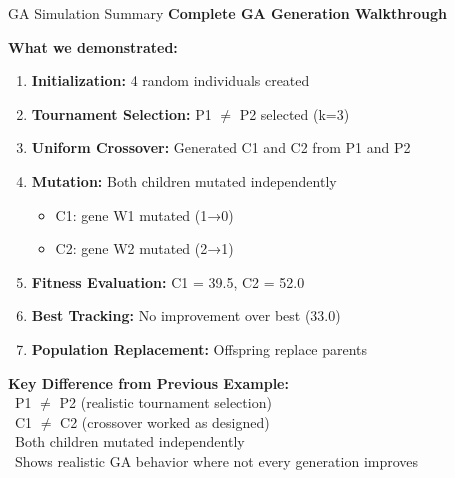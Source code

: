 \documentclass[aspectratio=169,10pt]{beamer}
\begin{document}
\begin{frame}{GA Simulation Summary}
  \colorbox{navymid}{\color{white}\bfseries\large Complete GA Generation Walkthrough}
  
  \vspace{0.3cm}
  \textbf{What we demonstrated:}
  
  \begin{enumerate}
    \item \textbf{Initialization:} 4 random individuals created
    \item \textbf{Tournament Selection:} P1 $\neq$ P2 selected (k=3)
    \item \textbf{Uniform Crossover:} Generated C1 and C2 from P1 and P2
    \item \textbf{Mutation:} Both children mutated independently
      \begin{itemize}
        \item C1: gene W1 mutated (1→0)
        \item C2: gene W2 mutated (2→1)
      \end{itemize}
    \item \textbf{Fitness Evaluation:} C1 = 39.5, C2 = 52.0
    \item \textbf{Best Tracking:} No improvement over best (33.0)
    \item \textbf{Population Replacement:} Offspring replace parents
  \end{enumerate}
  
  \vspace{0.3cm}
  \colorbox{mygreen}{\begin{minipage}{\linewidth}
    {\color{white}\small\bfseries Key Difference from Previous Example:}\\
    {\color{white}\scriptsize \textbullet\ P1 $\neq$ P2 (realistic tournament selection)}\\
    {\color{white}\scriptsize \textbullet\ C1 $\neq$ C2 (crossover worked as designed)}\\
    {\color{white}\scriptsize \textbullet\ Both children mutated independently}\\
    {\color{white}\scriptsize \textbullet\ Shows realistic GA behavior where not every generation improves}
  \end{minipage}}
\end{frame}
\end{document}
